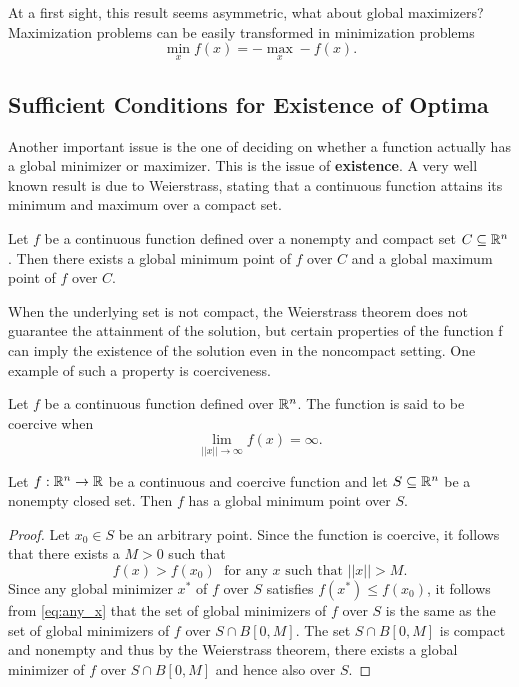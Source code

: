 \documentclass[10pt,a4paper]{article}
\begin{document}
\begin{remark}
At a first sight, this result seems asymmetric, what about global maximizers? Maximization problems can be easily transformed in minimization problems
$$\min_x f(x) = -\max_x -f(x).$$
\end{remark}


\subsection{Sufficient Conditions for Existence of Optima}
Another important issue is the one of deciding on whether a function actually has a
global minimizer or maximizer. This is the issue of \textbf{existence}. A very well known result is due to Weierstrass, stating that a continuous function attains its minimum and maximum over a compact set.

\begin{theorem}[Weierstrass]
	Let $f$ be a continuous function defined over a nonempty and compact set $C \subseteq \mathbb{R}^n$. Then there exists a global minimum point of $f$ over $C$ and a global maximum point of $f$ over $C$.
\end{theorem}
\noindent When the underlying set is not compact, the Weierstrass theorem does not guarantee
the attainment of the solution, but certain properties of the function f can imply the existence of the solution even in the noncompact setting. One example of such a property is coerciveness.
\begin{definition}[Coerciveness]
	Let $f$ be a continuous function defined over $\mathbb{R}^n$. The function is said to be coercive when 
	\begin{equation*}
		\lim_{||x||\to \infty} f(x) = \infty.
	\end{equation*}
\end{definition}
\begin{theorem}
	Let $f: \mathbb{R}^n \to \mathbb{R}$ be a continuous and coercive function and let $S \subseteq \mathbb{R}^n$ be a nonempty closed set. Then $f$ has a global minimum point over $S$.
\end{theorem}
\begin{proof}
	Let $x_0\in S$ be an arbitrary point. Since the function is coercive, it follows that there exists a $M>0$ such that
	\begin{equation}\label{eq:any_x}
		f(x)>f(x_0) \; \text{ for any $x$ such that } ||x||>M.
	\end{equation}
Since any global minimizer $x^*$ of $f$ over $S$ satisfies $f(x^*) \leq f(x_0)$, it follows from \eqref{eq:any_x} that  the set of global minimizers of $f$ over $S$ is the same as the set of global minimizers of $f$ over $S\cap B[0,M]$. The set $S\cap B[0,M]$ is compact and nonempty and thus by the Weierstrass theorem, there exists a global minimizer of $f$ over $S\cap B[0,M]$ and hence also over $S$.
\end{proof}



\end{document}
